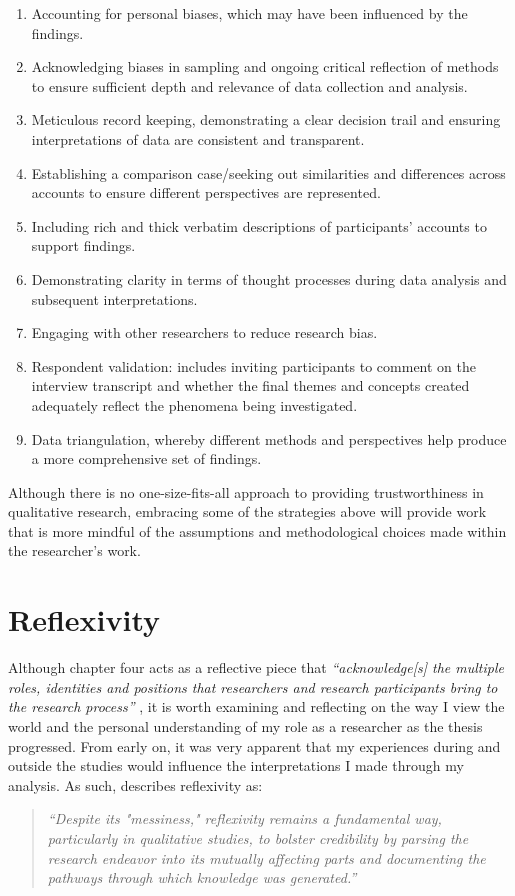 \begin{enumerate}
    \item Accounting for personal biases, which may have been influenced by the findings.
    \item Acknowledging biases in sampling and ongoing critical reflection of methods to ensure sufficient depth and relevance of data collection and analysis.
    \item Meticulous record keeping, demonstrating a clear decision trail and ensuring interpretations of data are consistent and transparent.
    \item Establishing a comparison case/seeking out similarities and differences across accounts to ensure different perspectives are represented.
    \item Including rich and thick verbatim descriptions of participants’ accounts to support findings.
    \item Demonstrating clarity in terms of thought processes during data analysis and subsequent interpretations.
    \item Engaging with other researchers to reduce research bias.
    \item Respondent validation: includes inviting participants to comment on the interview transcript and whether the final themes and concepts created adequately reflect the phenomena being investigated.
    \item Data triangulation, whereby different methods and perspectives help produce a more comprehensive set of findings.

\end{enumerate}
Although there is no one-size-fits-all approach to providing trustworthiness in qualitative research, embracing some of the strategies above will provide work that is more mindful of the assumptions and methodological choices made within the researcher's work.  


\section{Reflexivity}
\label{Method:Reflectivity}
Although chapter four acts as a reflective piece that \textit{``acknowledge[s] the multiple roles, identities and positions that researchers and research participants bring to the research process''} \citep[pg.395]{milner2007race}, it is worth examining and reflecting on the way I view the world and the personal understanding of my role as a researcher as the thesis progressed. From early on, it was very apparent that my experiences during and outside the studies would influence the interpretations I made through my analysis. As such, \cite{probst2015eye} describes reflexivity as:
\begin{quote}
\textit{``Despite its "messiness," reflexivity remains a fundamental way, particularly in qualitative studies, to bolster credibility by parsing the research endeavor into its mutually affecting parts and documenting the pathways through which knowledge was generated.'' \citep{probst2015eye}
}\end{quote}

